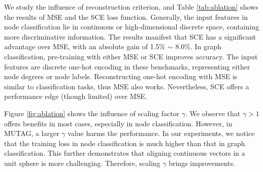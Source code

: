 We study the influence of reconstruction criterion, and Table \ref{tab:ablation} shows the results of MSE and the SCE loss function.
Generally, the input features in node classification lie in continuous or high-dimensional discrete space, containing more discriminative information.
The results manifest that SCE has a significant advantage over MSE,
with an absolute gain of 1.5\% $\sim$ 8.0\%.
In graph classification, pre-training with either MSE or SCE improves accuracy. 
The input features %
are discrete one-hot encoding in these benchmarks, 
representing either node degrees or node labels. 
Reconstructing one-hot encoding with MSE is
similar to classification tasks, thus MSE also works. Nevertheless, SCE offers a performance edge (though limited) over MSE. %


Figure \ref{fig:ablation} shows the influence of scaling factor $\gamma$.  We observe that $\gamma > 1$ offers benefits in most cases, especially in node classification. However, in MUTAG, a larger $\gamma$ value harms the performance. In our experiments, we notice that the training loss in node classification is much higher than that in graph classification. 
This further demonstrates that aligning continuous vectors in a unit sphere is more challenging. Therefore, scaling $\gamma$ brings improvements. 





\begin{table}[t]
\caption{Ablation studies of the decoder type, re-mask and reconstruction criterion on node- and graph-level datasets.}
\label{tab:ablation}
\renewcommand\tabcolsep{4pt}

\vspace{-2mm}
\end{table}





